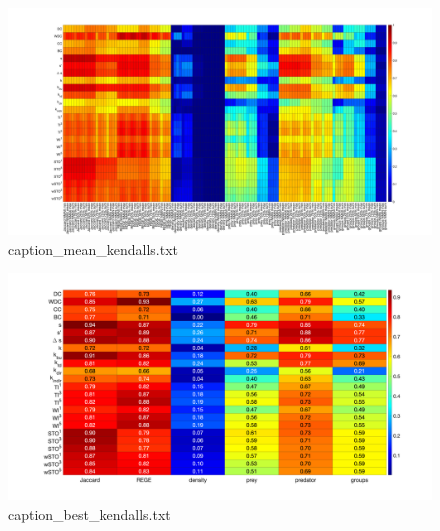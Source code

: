 \documentclass[onecolumn]{article} %
\begin{document}
						\begin{figure}[htbp]%
							\centering
							\includegraphics[width=1.0\linewidth]{mean_kendalls_a.png}
							\caption{ {caption_mean_kendalls.txt} }
							\label{fig:equivalences}
						\end{figure} %

						\begin{figure}[htbp]%
							\centering
							\includegraphics[width=1.0\linewidth]{best_kendalls.png}
							\caption{ {caption_best_kendalls.txt} }
							\label{fig:equivalences}
						\end{figure} %
\end{document}

